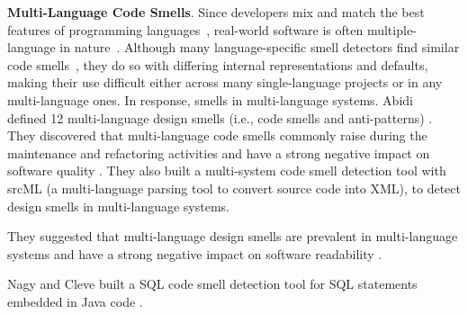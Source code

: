 





{\bf Multi-Language Code Smells}.
%
Since developers mix and match the best features of programming
languages~\cite{7476675}, real-world software is often multiple-language in
nature~\cite{723183}.
%
Although many language-specific smell detectors find similar code
smells~\cite{PMD,CheckStyle,Pysmell,Jscent,DesigniteJava}, they do so with
differing internal representations and defaults, making their use difficult
either across many single-language projects or in any multi-language ones.
%
In response, smells in multi-language systems. Abidi~\etal{} defined 12
multi-language design smells (i.e., code smells and anti-patterns)
\cite{MultiLanguageCodeSmells}. They discovered that multi-language code smells
commonly raise during the maintenance and refactoring activities and have a
strong negative impact on software quality \cite{Abidi2}. They also built a
multi-system code smell detection tool with srcML (a multi-language parsing
tool to convert source code into XML), to detect design smells in
multi-language systems.

They suggested that multi-language design smells are prevalent in
multi-language systems and have a strong negative impact on software
readability \cite{Fault-Prone}.

Nagy and Cleve built a SQL code smell detection tool for SQL statements
embedded in Java code \cite{SQLInJava}.
